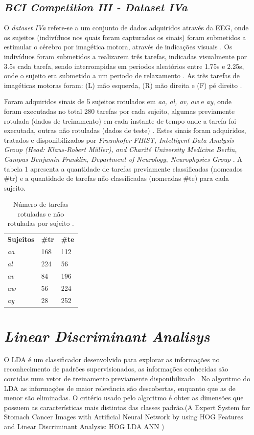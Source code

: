\subsection{\textit{BCI Competition III - Dataset IVa}}
O \textit{dataset IVa} refere-se a um conjunto de dados adquiridos através da EEG, onde os sujeitos (indivíduos nos quais foram capturados os sinais) foram submetidos a estimular o cérebro por imagética motora, através de indicações visuais \cite{BCICompetition}. Os indivíduos foram submetidos a realizarem três tarefas, indicadas visualmente por 3.5s cada tarefa, sendo interrompidas em periodos aleatórios entre 1.75s e 2.25s, onde o sujeito era submetido a um periodo de relaxamento \cite{BCICompetition}. As três tarefas de imagéticas motoras foram: (L) mão esquerda, (R) mão direita e (F) pé direito \cite{BCICompetition}.

Foram adquiridos sinais de 5 sujeitos rotulados em \textit{aa, al, av, aw} e \textit{ay}, onde foram executadas no total 280 tarefas por cada sujeito, algumas previamente rotulada (dados de treinamento) em cada instante de tempo onde a tarefa foi executada, outras não rotuladas (dados de teste) \cite{siteBCI}. Estes sinais foram adquiridos, tratados e disponibilizados por \textit{Fraunhofer FIRST, Intelligent Data Analysis Group (Head: Klaus-Robert Müller), and Charité University Medicine Berlin, Campus Benjamin Franklin, Department of Neurology, Neurophysics Group} \cite{BCICompetition}. A tabela 1 apresenta a quantidade de tarefas previamente classificadas (nomeados \#tr) e a quantidade de tarefas não classificadas (nomeadas \#te) para cada sujeito.

\begin{table}[h!]
	\centering
	\caption{Número de tarefas rotuladas e não rotuladas por sujeito \cite{BCICompetition}.}
	\label{my-label}
	\begin{tabular}{lll}
		\textbf{Sujeitos} & \textbf{\#tr} & \textbf{\#te} \\
		\textit{aa} & 168 & 112 \\
		\textit{al} & 224 & 56 \\
		\textit{av} & 84 & 196 \\
		\textit{aw} & 56 & 224 \\
		\textit{ay} & 28 & 252
	\end{tabular}
\end{table}
 
\section{\textit{Linear Discriminant Analisys}}
O LDA é um classificador desenvolvido para explorar as informações no reconhecimento de padrões supervisionados,
as informações conhecidas são contidas num vetor de treinamento previamente disponibilizado \cite{izenmanLDA}.
No algoritmo do LDA as informações de maior relevância são descobertas, enquanto que as de menor são 
eliminadas. O critério usado pelo algoritmo é obter as dimensões que possuem as características mais
distintas das classes padrão.(A Expert System for Stomach Cancer Images with
Artificial Neural Network by using HOG Features
and Linear Discriminant Analysis:
HOG LDA ANN )

